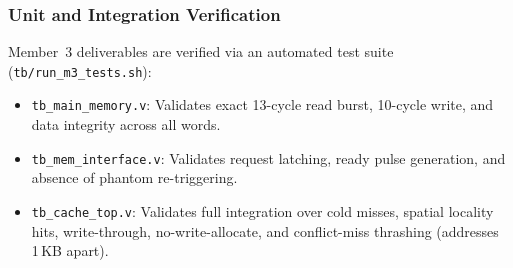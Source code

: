 \subsubsection{Unit and Integration Verification}
Member~3 deliverables are verified via an automated test suite (\texttt{tb/run\_m3\_tests.sh}):
\begin{itemize}
    \item \texttt{tb\_main\_memory.v}: Validates exact 13-cycle read burst,
        10-cycle write, and data integrity across all words.
    \item \texttt{tb\_mem\_interface.v}: Validates request latching, ready pulse
        generation, and absence of phantom re-triggering.
    \item \texttt{tb\_cache\_top.v}: Validates full integration over cold misses,
        spatial locality hits, write-through, no-write-allocate, and conflict-miss
        thrashing (addresses 1\,KB apart).
\end{itemize}


